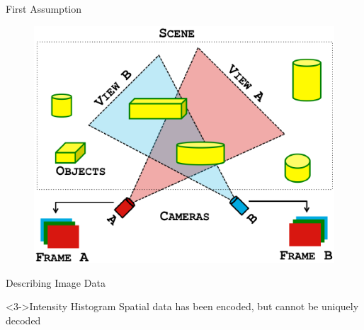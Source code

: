 \documentclass[serif]{beamer}
\begin{document}
\begin{frame}[c]{\sc First Assumption}

\begin{figure}
\centering
\includegraphics[width=.9\columnwidth]{Terminology}
\label{assumption}
\end{figure}

\end{frame}


\begin{frame}[c]{\sc Describing Image Data}

\begin{figure}
\centering
{}
\pause
{}
\label{infoTheory2}
\end{figure}

\begin{block}<3->{Intensity Histogram}
Spatial data has been encoded, but cannot be uniquely decoded
\end{block}


\end{frame}
\end{document}
